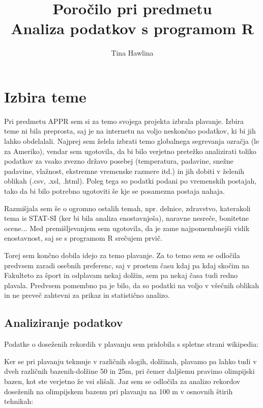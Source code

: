 \documentclass[11pt,a4paper]{article}
\begin{document}
\title{Poročilo pri predmetu \\
Analiza podatkov s programom R}
\author{Tina Hawlina}
\maketitle

\section{Izbira teme}


Pri predmetu APPR sem si za temo svojega projekta izbrala plavanje. Izbira teme ni bila preprosta, saj je na internetu na voljo neskončno podatkov, ki bi jih lahko obdelalali. Najprej sem želela izbrati temo globalnega segrevanja ozračja (le za Ameriko), vendar sem ugotovila, da bi bilo verjetno pretežko analizirati toliko podatkov za vsako zvezno državo posebej (temperatura, padavine, snežne padavine, vlažnost, ekstremne vremenske razmere itd.) in jih dobiti v želenih oblikah (.csv, .xsl, .html). Poleg tega so podatki podani po vremenskih postajah, tako da bi bilo potrebno ugotoviti še kje se posamezna postaja nahaja.

Razmišjala sem še o ogromno ostalih temah, npr. delnice, zdravstvo, katerakoli tema is STAT-SI (ker bi bila analiza enostavnješa), naravne nesreče, bonitetne ocene... Med premišljevanjem sem ugotovila, da je zame najpomembnejši vidik enostavnost, saj se s programom R srečujem prvič.

Torej sem končno dobila idejo za temo plavanje. Za to temo sem se odločila predvsem zaradi osebnih preferenc, saj v prostem času kdaj pa kdaj skočim na Fakulteto za šport in odplavam nekaj dolžin, sem pa nekaj časa tudi redno plavala. Predvsem pomembno pa je bilo, da so podatki na voljo v všečnih oblikah in ne preveč zahtevni za prikaz in statistično analizo. 


\subsection{Analiziranje podatkov}

Podatke o doseženih rekordih v plavanju sem pridobila s spletne strani wikipedia:
Ker se pri plavanju tekmuje v različnih slogih, dolžinah, plavamo pa lahko tudi v dveh različnih bazenih-dolžine 50 in 25m, pri čemer daljšemu pravimo olimpijski bazen, kot ste verjetno že vsi slišali. Jaz sem se odločila za analizo rekordov doseženih na olimpijskem bazenu pri plavanju na 100 m  v osnovnih štirih tehnikah:
\end{document}
